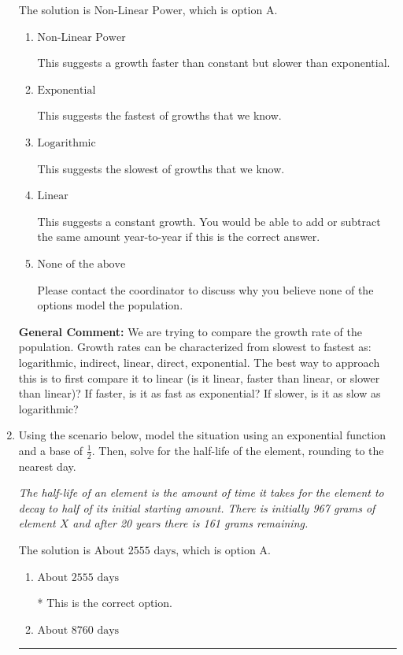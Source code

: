 \documentclass{extbook}[14pt]
\newcommand{\litem}[1]{\item #1

\rule{\textwidth}{0.4pt}}
\begin{document}
\begin{enumerate}
{The solution is \( \text{Non-Linear Power} \), which is option A.\begin{enumerate}[label=\Alph*.]
\item \( \text{Non-Linear Power} \)

This suggests a growth faster than constant but slower than exponential.
\item \( \text{Exponential} \)

This suggests the fastest of growths that we know.
\item \( \text{Logarithmic} \)

This suggests the slowest of growths that we know.
\item \( \text{Linear} \)

This suggests a constant growth. You would be able to add or subtract the same amount year-to-year if this is the correct answer.
\item \( \text{None of the above} \)

Please contact the coordinator to discuss why you believe none of the options model the population.
\end{enumerate}

\textbf{General Comment:} We are trying to compare the growth rate of the population. Growth rates can be characterized from slowest to fastest as: logarithmic, indirect, linear, direct, exponential. The best way to approach this is to first compare it to linear (is it linear, faster than linear, or slower than linear)? If faster, is it as fast as exponential? If slower, is it as slow as logarithmic?
}
\litem{
Using the scenario below, model the situation using an exponential function and a base of $\frac{1}{2}$. Then, solve for the half-life of the element, rounding to the nearest day.

\begin{center}
    \textit{ The half-life of an element is the amount of time it takes for the element to decay to half of its initial starting amount. There is initially 967 grams of element $X$ and after 20 years there is 161 grams remaining. }
\end{center}


The solution is \( \text{About } 2555 \text{ days} \), which is option A.\begin{enumerate}[label=\Alph*.]
\item \( \text{About } 2555 \text{ days} \)

* This is the correct option.
\item \( \text{About } 8760 \text{ days} \)


\end{enumerate}}
\end{enumerate}
\end{document}
